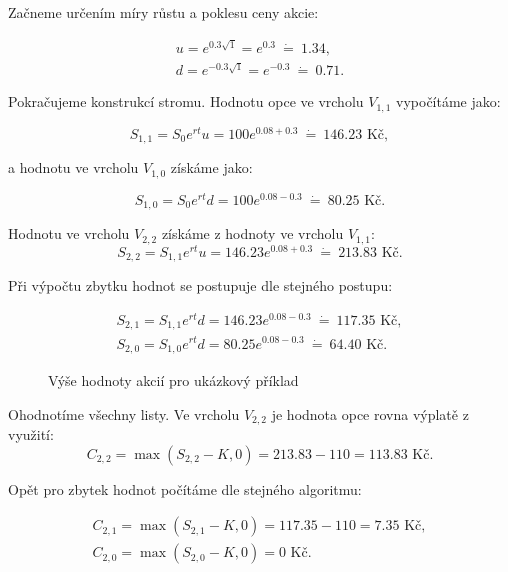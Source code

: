 \documentclass[male,czech,api_bc]{kitheses}
\begin{document}
  Začneme určením míry růstu a poklesu ceny akcie:

  \begin{gather*}
    u = e^{0.3 \sqrt{1}} = e^{0.3} \ \dot{=}\  1.34, \\
    d = e^{-0.3 \sqrt{1}} = e^{-0.3} \ \dot{=}\  0.71.
  \end{gather*}

  Pokračujeme konstrukcí stromu. Hodnotu opce ve vrcholu $V_{1, 1}$ vypočítáme jako:

  \begin{equation*}
    S_{1, 1} = S_0 e^{rt} u = 100 e^{0.08 + 0.3} \ \dot{=}\  146.23 \text{ Kč},
  \end{equation*}

  a hodnotu ve vrcholu $V_{1, 0}$ získáme jako:

  \begin{equation*}
    S_{1, 0} = S_0 e^{rt} d = 100 e^{0.08 - 0.3} \ \dot{=}\  80.25 \text{ Kč}.
  \end{equation*}

  Hodnotu ve vrcholu $V_{2, 2}$ získáme z hodnoty ve vrcholu $V_{1, 1}$:
  \begin{equation*}
    S_{2, 2} = S_{1, 1} e^{rt} u = 146.23 e^{0.08 + 0.3} \ \dot{=}\  213.83 \text{ Kč}.
  \end{equation*}

  Při výpočtu zbytku hodnot se postupuje dle stejného postupu:

  \begin{gather*}
    S_{2, 1} = S_{1, 1} e^{rt} d = 146.23 e^{0.08 - 0.3} \ \dot{=}\  117.35 \text{ Kč}, \\
    S_{2, 0} = S_{1, 0} e^{rt} d = 80.25 e^{0.08 - 0.3} \ \dot{=}\  64.40 \text{ Kč}.
  \end{gather*}

  \begin{figure}[h]
    \centering
    \caption{Výše hodnoty akcií pro ukázkový příklad}
  \end{figure}

  Ohodnotíme všechny listy. Ve vrcholu $V_{2, 2}$ je hodnota opce rovna výplatě z využití:
  \begin{equation*}
    C_{2, 2} = \max(S_{2, 2} - K, 0) = 213.83 - 110 = 113.83 \text{ Kč}.
  \end{equation*}

  Opět pro zbytek hodnot počítáme dle stejného algoritmu:

  \begin{gather*}
    C_{2, 1} = \max(S_{2, 1} - K, 0) = 117.35 - 110 = 7.35 \text{ Kč}, \\
    C_{2, 0} = \max(S_{2, 0} - K, 0) = 0 \text{ Kč}.  \\
  \end{gather*}
\end{document}
